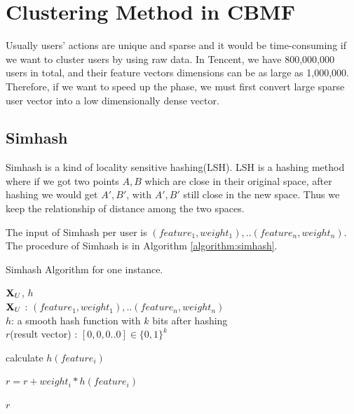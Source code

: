 \section{Clustering Method in CBMF}

Usually users’ actions are unique and sparse and it would be time-consuming if we want to cluster users by using raw data. In Tencent, we have 800,000,000 users in total, and their feature vectors dimensions can be as large as 1,000,000. Therefore, if we want to speed up the phase, we must first convert large sparse user vector into a low dimensionally dense vector.

\subsection{Simhash}

Simhash is a kind of locality sensitive hashing(LSH). LSH is a hashing method where if we got two points $A,B$ which are close in their original space, after hashing we would get $A',B'$, with $A',B'$ still close in the new space. Thus we keep the relationship of distance among the two spaces. 

The input of Simhash per user is $(feature_1, weight_1),..(feature_n,weight_n)$. The procedure of Simhash is in Algorithm \ref{algorithm:simhash}.

\begin{algorithm}[tb]
\caption{Simhash Algorithm for one instance.}
\begin{algorithmic}

 $\mathbf{X}_U$, $h$\\
$\mathbf{X}_{U}$ : $(feature_1, weight_1),..(feature_n,weight_n)$ \\
$h$: a smooth hash function with $k$ bits after hashing\\

 $r$(result vector) : $[0,0,0..0] \in \{0,1\}^k$


\STATE calculate $h(feature_i)$

\STATE $r = r + weight_i * h(feature_i)$

\ENDFOR

\ELSE 
{}
\ENDIF
\ENDFOR

 $r$

\end{algorithmic}
\label{algorithm:simhash}
\end{algorithm}

